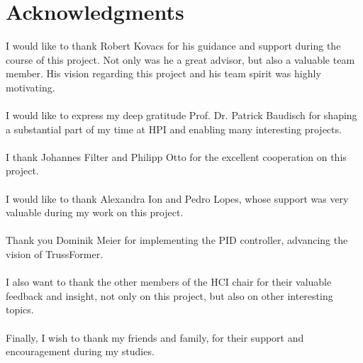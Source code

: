 
\begingroup
\let\clearpage\relax
\let\cleardoublepage\relax
\let\cleardoublepage\relax
\chapter*{Acknowledgments}
I would like to thank Robert Kovacs for his guidance and support during the course of this project. Not only was he a great advisor, but also a valuable team member. His vision regarding this project and his team spirit was highly motivating.\\
\\
I  would like to express my deep gratitude Prof. Dr. Patrick Baudisch for shaping a substantial part of my time at HPI and enabling many interesting projects.\\
\\
I thank Johannes Filter and Philipp Otto for the excellent cooperation on this project.\\
\\
I would like to thank Alexandra Ion and Pedro Lopes, whose support was very valuable during my work on this project.\\
\\
Thank you Dominik Meier for implementing the PID controller, advancing the vision of TrussFormer.\\
\\
I also want to thank the other members of the HCI chair for their valuable feedback and insight, not only on this project, but also on other interesting topics.\\
\\
Finally, I wish to thank my friends and family, for their support and encouragement during my studies.


\endgroup
